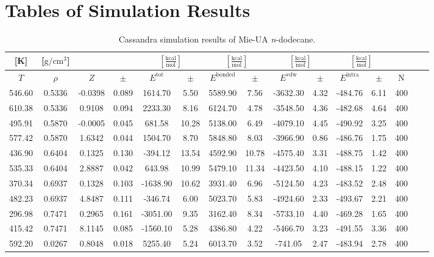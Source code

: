 \documentclass[%
 aip,
 jcp,
 sd,%
 amsmath,amssymb,
]{revtex4-1}
\begin{document}
\section{Tables of Simulation Results}
\begin{table*}[!htbp]
\centering
\caption{Cassandra simulation results of Mie-UA \textit{n}-dodecane.}
\label{tab:NIST-VAL-C12-FTT}
\begin{ruledtabular}
\begin{tabular}{ccccccccccccccc}
[K] & [$\mathrm{g/cm^3}$] &  &  & \multicolumn{2}{c}{$[\frac{\mathrm{kcal}}{\mathrm{mol}}]$} & \multicolumn{2}{c}{$[\frac{\mathrm{kcal}}{\mathrm{mol}}]$} & \multicolumn{2}{c}{$[\frac{\mathrm{kcal}}{\mathrm{mol}}]$} &\multicolumn{2}{c}{$[\frac{\mathrm{kcal}}{\mathrm{mol}}]$} & \\
\hline
$T$ & $\rho$ & $Z$ & $\pm$ & $E^{\mathrm{tot}}$ & $\pm$ & $E^{\mathrm{bonded}}$ & $\pm$ & $E^{\mathrm{vdw}}$ & $\pm$ & $E^{\mathrm{intra}}$ & $\pm$ & N\\
\hline
546.60	&	0.5336	&	-0.0398	&	0.089	&	1614.70	&	5.50	&	5589.90	&	7.56	&	-3632.30	&	4.32	&	-484.76	&	6.11	&	400	\\
610.38	&	0.5336	&	0.9108	&	0.094	&	2233.30	&	8.16	&	6124.70	&	4.78	&	-3548.50	&	4.36	&	-482.68	&	4.64	&	400	\\
495.91	&	0.5870	&	-0.0005	&	0.045	&	681.58	&	10.28	&	5138.00	&	6.49	&	-4079.10	&	4.45	&	-490.92	&	3.25	&	400	\\
577.42	&	0.5870	&	1.6342	&	0.044	&	1504.70	&	8.70	&	5848.80	&	8.03	&	-3966.90	&	0.86	&	-486.76	&	1.75	&	400	\\
436.90	&	0.6404	&	0.1325	&	0.130	&	-394.12	&	13.54	&	4592.90	&	10.78	&	-4575.40	&	3.31	&	-488.75	&	1.42	&	400	\\
535.33	&	0.6404	&	2.8887	&	0.042	&	643.98	&	10.99	&	5479.10	&	11.34	&	-4423.50	&	4.10	&	-488.15	&	1.22	&	400	\\
370.34	&	0.6937	&	0.1328	&	0.103	&	-1638.90	&	10.62	&	3931.40	&	6.96	&	-5124.50	&	4.23	&	-483.52	&	2.48	&	400	\\
482.23	&	0.6937	&	4.8487	&	0.111	&	-346.74	&	6.00	&	5023.70	&	5.83	&	-4924.60	&	2.33	&	-493.67	&	2.21	&	400	\\
296.98	&	0.7471	&	0.2965	&	0.161	&	-3051.00	&	9.35	&	3162.40	&	8.34	&	-5733.10	&	4.40	&	-469.28	&	1.65	&	400	\\
415.42	&	0.7471	&	8.1145	&	0.085	&	-1560.10	&	5.28	&	4386.80	&	4.22	&	-5466.70	&	3.23	&	-491.55	&	3.36	&	400	\\
592.20	&	0.0267	&	0.8048	&	0.018	&	5255.40	&	5.24	&	6013.70	&	3.52	&	-741.05	&	2.47	&	-483.94	&	2.78	&	400	\\

\end{tabular}
\end{ruledtabular}
\end{table*}
\end{document}
